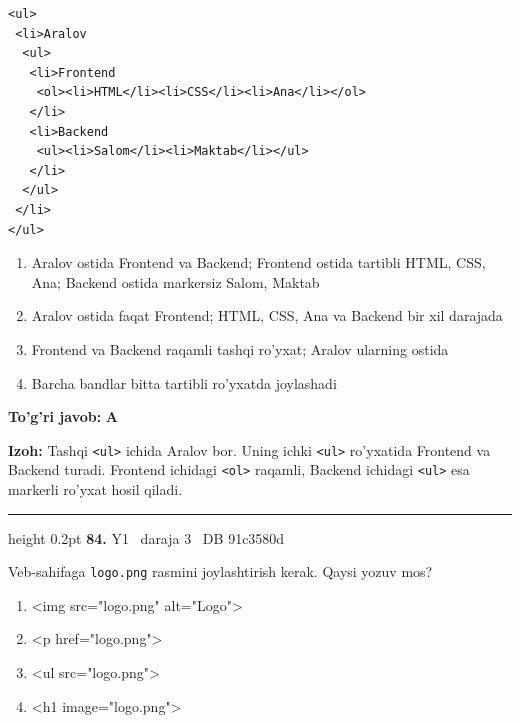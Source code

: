 \documentclass[10pt,a4paper,oneside]{article}
\begin{document}
\par
\begin{lstlisting}
<ul>
 <li>Aralov
  <ul>
   <li>Frontend
    <ol><li>HTML</li><li>CSS</li><li>Ana</li></ol>
   </li>
   <li>Backend
    <ul><li>Salom</li><li>Maktab</li></ul>
   </li>
  </ul>
 </li>
</ul>
\end{lstlisting}

\begin{enumerate}[label=\Alph*),leftmargin=9mm]
\item Aralov ostida Frontend va Backend; Frontend ostida tartibli HTML, CSS, Ana; Backend ostida markersiz Salom, Maktab
\item Aralov ostida faqat Frontend; HTML, CSS, Ana va Backend bir xil darajada
\item Frontend va Backend raqamli tashqi ro'yxat; Aralov ularning ostida
\item Barcha bandlar bitta tartibli ro'yxatda joylashadi
\end{enumerate}
\begin{tcolorbox}[enhanced,breakable,colback=teal!4,colframe=teal!45!black,boxrule=0.45pt,arc=1.2mm,left=2.8mm,right=2.8mm,top=2mm,bottom=2mm,before skip=2mm,after skip=2mm]
\textbf{\color{teal}To'g'ri javob:} \textbf{A}
\par\smallskip
\textbf{Izoh:} Tashqi \texttt{\textless{}ul\textgreater{}} ichida Aralov bor. Uning ichki \texttt{\textless{}ul\textgreater{}} ro'yxatida Frontend va Backend turadi. Frontend ichidagi \texttt{\textless{}ol\textgreater{}} raqamli, Backend ichidagi \texttt{\textless{}ul\textgreater{}} esa markerli ro'yxat hosil qiladi.
\end{tcolorbox}
\vspace{2mm}\hrule height 0.2pt \vspace{4mm}
\hypertarget{q84}{\textbf{\color{ink}84.}}  {\color{muted}\scriptsize Y1 \textbullet\ daraja 3 \textbullet\ DB 91c3580d}
\par
Veb-sahifaga \texttt{logo.png} rasmini joylashtirish kerak. Qaysi yozuv mos?
\begin{enumerate}[label=\Alph*),leftmargin=9mm]
\item \textless{}img src="logo.png" alt="Logo"\textgreater{}
\item \textless{}p href="logo.png"\textgreater{}
\item \textless{}ul src="logo.png"\textgreater{}
\item \textless{}h1 image="logo.png"\textgreater{}
\end{enumerate}
\end{document}
